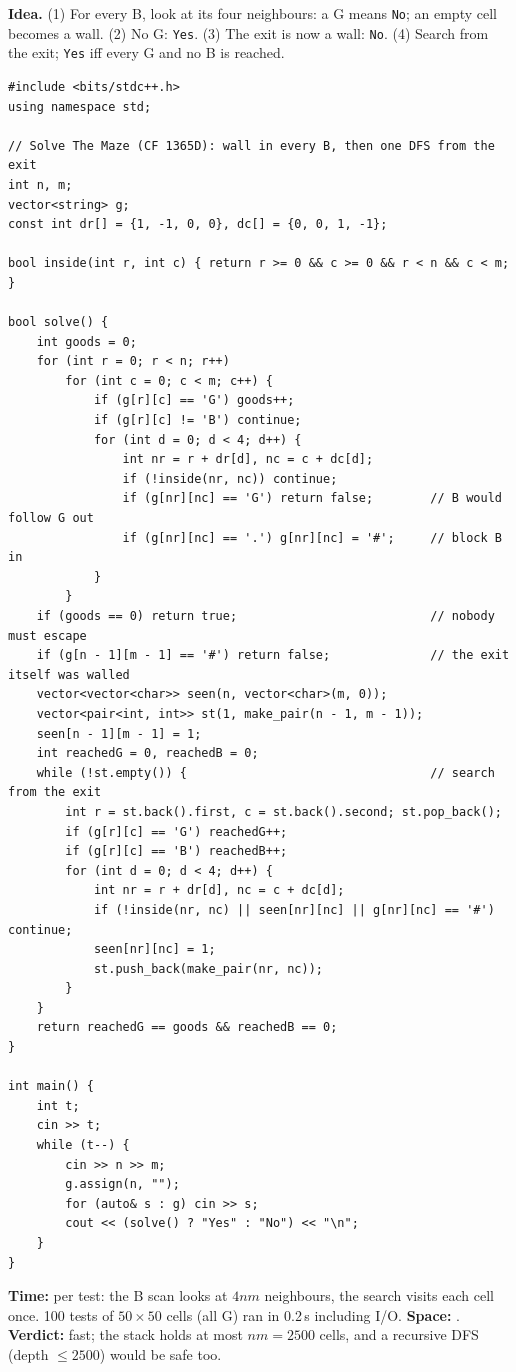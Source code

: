 \begin{algorithmbox}
\textbf{Idea.} (1) For every B, look at its four neighbours: a G means \texttt{No}; an empty cell becomes a wall. (2) No G: \texttt{Yes}. (3) The exit is now a wall: \texttt{No}. (4) Search from the exit; \texttt{Yes} iff every G and no B is reached.

\begin{lstlisting}[style=cpp]
#include <bits/stdc++.h>
using namespace std;

// Solve The Maze (CF 1365D): wall in every B, then one DFS from the exit
int n, m;
vector<string> g;
const int dr[] = {1, -1, 0, 0}, dc[] = {0, 0, 1, -1};

bool inside(int r, int c) { return r >= 0 && c >= 0 && r < n && c < m; }

bool solve() {
    int goods = 0;
    for (int r = 0; r < n; r++)
        for (int c = 0; c < m; c++) {
            if (g[r][c] == 'G') goods++;
            if (g[r][c] != 'B') continue;
            for (int d = 0; d < 4; d++) {
                int nr = r + dr[d], nc = c + dc[d];
                if (!inside(nr, nc)) continue;
                if (g[nr][nc] == 'G') return false;        // B would follow G out
                if (g[nr][nc] == '.') g[nr][nc] = '#';     // block B in
            }
        }
    if (goods == 0) return true;                           // nobody must escape
    if (g[n - 1][m - 1] == '#') return false;              // the exit itself was walled
    vector<vector<char>> seen(n, vector<char>(m, 0));
    vector<pair<int, int>> st(1, make_pair(n - 1, m - 1));
    seen[n - 1][m - 1] = 1;
    int reachedG = 0, reachedB = 0;
    while (!st.empty()) {                                  // search from the exit
        int r = st.back().first, c = st.back().second; st.pop_back();
        if (g[r][c] == 'G') reachedG++;
        if (g[r][c] == 'B') reachedB++;
        for (int d = 0; d < 4; d++) {
            int nr = r + dr[d], nc = c + dc[d];
            if (!inside(nr, nc) || seen[nr][nc] || g[nr][nc] == '#') continue;
            seen[nr][nc] = 1;
            st.push_back(make_pair(nr, nc));
        }
    }
    return reachedG == goods && reachedB == 0;
}

int main() {
    int t;
    cin >> t;
    while (t--) {
        cin >> n >> m;
        g.assign(n, "");
        for (auto& s : g) cin >> s;
        cout << (solve() ? "Yes" : "No") << "\n";
    }
}
\end{lstlisting}

\begin{complexitybox}
\textbf{Time:}  per test: the B scan looks at $4nm$ neighbours, the search visits each cell once. 100 tests of $50 \times 50$ cells (all G) ran in 0.2\,s including I/O. \textbf{Space:} . \textbf{Verdict:} fast; the stack holds at most $nm = 2500$ cells, and a recursive DFS (depth $\le 2500$) would be safe too.
\end{complexitybox}
\end{algorithmbox}

